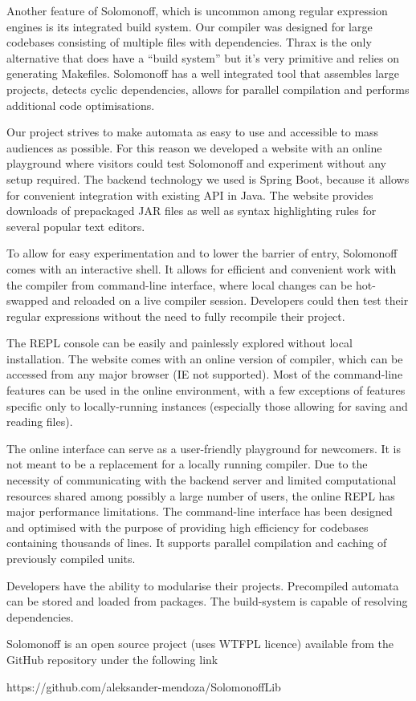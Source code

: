 Another feature of Solomonoff, which is uncommon among regular expression engines is its integrated build system. Our compiler was designed for large codebases consisting of multiple files with dependencies. Thrax is the only alternative that does have a ``build system'' but it's very primitive and relies on generating Makefiles. Solomonoff has a well integrated tool that assembles large projects, detects cyclic dependencies, allows for parallel compilation and performs additional code optimisations. 


Our project strives to make automata as easy to use and accessible to mass audiences as possible. For this reason we developed a website with an online playground where visitors could test Solomonoff and experiment without any setup required. The backend technology we used is Spring Boot, because it allows for convenient integration with existing API in Java. The website provides downloads of prepackaged JAR files as well as syntax highlighting rules for several popular text editors. 



To allow for easy experimentation and to lower the barrier of entry, Solomonoff comes with an interactive shell. It allows for efficient and convenient work with the compiler from command-line interface, where local changes can be hot-swapped and reloaded on a live compiler session. Developers could then test their regular expressions without the need to fully recompile their project. 

The REPL console can be easily and painlessly explored without local installation. The website comes with an online version of compiler, which can be accessed from any major browser (IE not supported). Most of the command-line features can be used in the online environment, with a few exceptions of features specific only to locally-running instances (especially those allowing for saving and reading files). 

The online interface can serve as a user-friendly playground for newcomers. It is not meant to be a replacement for a locally running compiler. Due to the necessity of communicating with the backend server and limited computational resources shared among possibly a large number of users, the online REPL has major performance limitations. The command-line interface has been designed and optimised with the purpose of providing high efficiency for codebases containing thousands of lines. It supports parallel compilation and caching of previously compiled units. 

Developers have the ability to modularise their projects. Precompiled automata can be stored and loaded from packages. The build-system is capable of resolving dependencies.

Solomonoff is an open source project (uses WTFPL licence) available from the GitHub repository under the following link
\begin{center}
	https://github.com/aleksander-mendoza/SolomonoffLib
\end{center}



